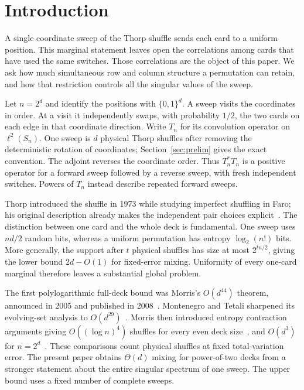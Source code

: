 \section{Introduction}
A single coordinate sweep of the Thorp shuffle sends each card to a uniform position. This marginal statement leaves open the correlations among cards that have used the same switches. Those correlations are the object of this paper. We ask how much simultaneous row and column structure a permutation can retain, and how that restriction controls all the singular values of the sweep.

Let $n=2^d$ and identify the positions with $\{0,1\}^d$. A sweep visits the coordinates in order. At a visit it independently swaps, with probability $1/2$, the two cards on each edge in that coordinate direction. Write $T_n$ for its convolution operator on $\ell^2(S_n)$. One sweep is $d$ physical Thorp shuffles after removing the deterministic rotation of coordinates; Section~\ref{sec:prelim} gives the exact convention. The adjoint reverses the coordinate order. Thus $T_n^*T_n$ is a positive operator for a forward sweep followed by a reverse sweep, with fresh independent switches. Powers of $T_n$ instead describe repeated forward sweeps.

Thorp introduced the shuffle in 1973 while studying imperfect shuffling in Faro; his original description already makes the independent pair choices explicit~\cite[Section~3.1]{Thorp1973}. The distinction between one card and the whole deck is fundamental. One sweep uses $nd/2$ random bits, whereas a uniform permutation has entropy $\log_2(n!)$ bits. More generally, the support after $t$ physical shuffles has size at most $2^{tn/2}$, giving the lower bound $2d-O(1)$ for fixed-error mixing. Uniformity of every one-card marginal therefore leaves a substantial global problem.

The first polylogarithmic full-deck bound was Morris's $O(d^{44})$ theorem, announced in 2005 and published in 2008~\cite{Morris2008}. Montenegro and Tetali sharpened its evolving-set analysis to $O(d^{29})$~\cite[Section~6.4, Theorems~6.14--6.15]{MontenegroTetali2006}. Morris then introduced entropy contraction arguments giving $O((\log n)^4)$ shuffles for every even deck size~\cite{Morris2009}, and $O(d^3)$ for $n=2^d$~\cite{Morris2013}. These comparisons count physical shuffles at fixed total-variation error. The present paper obtains $\Theta(d)$ mixing for power-of-two decks from a stronger statement about the entire singular spectrum of one sweep. The upper bound uses a fixed number of complete sweeps.

